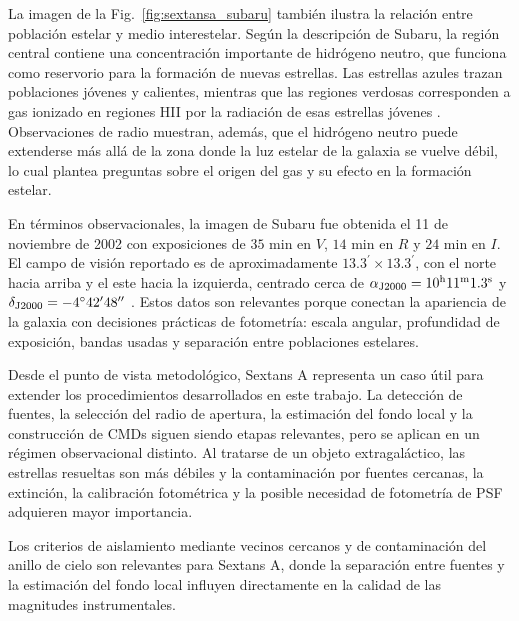 \documentclass[12pt,letterpaper,oneside]{book}
\begin{document}
La imagen de la Fig.~\ref{fig:sextansa_subaru} también ilustra la relación entre población estelar y medio interestelar. Según la descripción de Subaru, la región central contiene una concentración importante de hidrógeno neutro, que funciona como reservorio para la formación de nuevas estrellas. Las estrellas azules trazan poblaciones jóvenes y calientes, mientras que las regiones verdosas corresponden a gas ionizado en regiones HII por la radiación de esas estrellas jóvenes \citep{subaru2004sextansa}. Observaciones de radio muestran, además, que el hidrógeno neutro puede extenderse más allá de la zona donde la luz estelar de la galaxia se vuelve débil, lo cual plantea preguntas sobre el origen del gas y su efecto en la formación estelar.

En términos observacionales, la imagen de Subaru fue obtenida el 11 de noviembre de 2002 con exposiciones de $35$ min en $V$, $14$ min en $R$ y $24$ min en $I$. El campo de visión reportado es de aproximadamente $13.3^{\prime}\times13.3^{\prime}$, con el norte hacia arriba y el este hacia la izquierda, centrado cerca de $\alpha_{\rm J2000}=10^{\rm h}11^{\rm m}1.3^{\rm s}$ y $\delta_{\rm J2000}=-4^{\circ}42^{\prime}48^{\prime\prime}$ \citep{subaru2004sextansa}. Estos datos son relevantes porque conectan la apariencia de la galaxia con decisiones prácticas de fotometría: escala angular, profundidad de exposición, bandas usadas y separación entre poblaciones estelares.

Desde el punto de vista metodológico, Sextans A representa un caso útil para extender los procedimientos desarrollados en este trabajo. La detección de fuentes, la selección del radio de apertura, la estimación del fondo local y la construcción de CMDs siguen siendo etapas relevantes, pero se aplican en un régimen observacional distinto. Al tratarse de un objeto extragaláctico, las estrellas resueltas son más débiles y la contaminación por fuentes cercanas, la extinción, la calibración fotométrica y la posible necesidad de fotometría de PSF adquieren mayor importancia.

Los criterios de aislamiento mediante vecinos cercanos y de contaminación del anillo de cielo son relevantes para Sextans A, donde la separación entre fuentes y la estimación del fondo local influyen directamente en la calidad de las magnitudes instrumentales.


\end{document}
